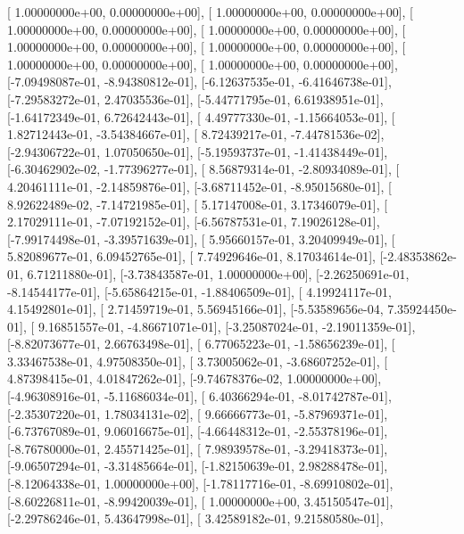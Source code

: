 \documentclass{article}
\begin{document}
       [ 1.00000000e+00,  0.00000000e+00],
       [ 1.00000000e+00,  0.00000000e+00],
       [ 1.00000000e+00,  0.00000000e+00],
       [ 1.00000000e+00,  0.00000000e+00],
       [ 1.00000000e+00,  0.00000000e+00],
       [ 1.00000000e+00,  0.00000000e+00],
       [ 1.00000000e+00,  0.00000000e+00],
       [ 1.00000000e+00,  0.00000000e+00],
       [-7.09498087e-01, -8.94380812e-01],
       [-6.12637535e-01, -6.41646738e-01],
       [-7.29583272e-01,  2.47035536e-01],
       [-5.44771795e-01,  6.61938951e-01],
       [-1.64172349e-01,  6.72642443e-01],
       [ 4.49777330e-01, -1.15664053e-01],
       [ 1.82712443e-01, -3.54384667e-01],
       [ 8.72439217e-01, -7.44781536e-02],
       [-2.94306722e-01,  1.07050650e-01],
       [-5.19593737e-01, -1.41438449e-01],
       [-6.30462902e-02, -1.77396277e-01],
       [ 8.56879314e-01, -2.80934089e-01],
       [ 4.20461111e-01, -2.14859876e-01],
       [-3.68711452e-01, -8.95015680e-01],
       [ 8.92622489e-02, -7.14721985e-01],
       [ 5.17147008e-01,  3.17346079e-01],
       [ 2.17029111e-01, -7.07192152e-01],
       [-6.56787531e-01,  7.19026128e-01],
       [-7.99174498e-01, -3.39571639e-01],
       [ 5.95660157e-01,  3.20409949e-01],
       [ 5.82089677e-01,  6.09452765e-01],
       [ 7.74929646e-01,  8.17034614e-01],
       [-2.48353862e-01,  6.71211880e-01],
       [-3.73843587e-01,  1.00000000e+00],
       [-2.26250691e-01, -8.14544177e-01],
       [-5.65864215e-01, -1.88406509e-01],
       [ 4.19924117e-01,  4.15492801e-01],
       [ 2.71459719e-01,  5.56945166e-01],
       [-5.53589656e-04,  7.35924450e-01],
       [ 9.16851557e-01, -4.86671071e-01],
       [-3.25087024e-01, -2.19011359e-01],
       [-8.82073677e-01,  2.66763498e-01],
       [ 6.77065223e-01, -1.58656239e-01],
       [ 3.33467538e-01,  4.97508350e-01],
       [ 3.73005062e-01, -3.68607252e-01],
       [ 4.87398415e-01,  4.01847262e-01],
       [-9.74678376e-02,  1.00000000e+00],
       [-4.96308916e-01, -5.11686034e-01],
       [ 6.40366294e-01, -8.01742787e-01],
       [-2.35307220e-01,  1.78034131e-02],
       [ 9.66666773e-01, -5.87969371e-01],
       [-6.73767089e-01,  9.06016675e-01],
       [-4.66448312e-01, -2.55378196e-01],
       [-8.76780000e-01,  2.45571425e-01],
       [ 7.98939578e-01, -3.29418373e-01],
       [-9.06507294e-01, -3.31485664e-01],
       [-1.82150639e-01,  2.98288478e-01],
       [-8.12064338e-01,  1.00000000e+00],
       [-1.78117716e-01, -8.69910802e-01],
       [-8.60226811e-01, -8.99420039e-01],
       [ 1.00000000e+00,  3.45150547e-01],
       [-2.29786246e-01,  5.43647998e-01],
       [ 3.42589182e-01,  9.21580580e-01],
\end{document}
